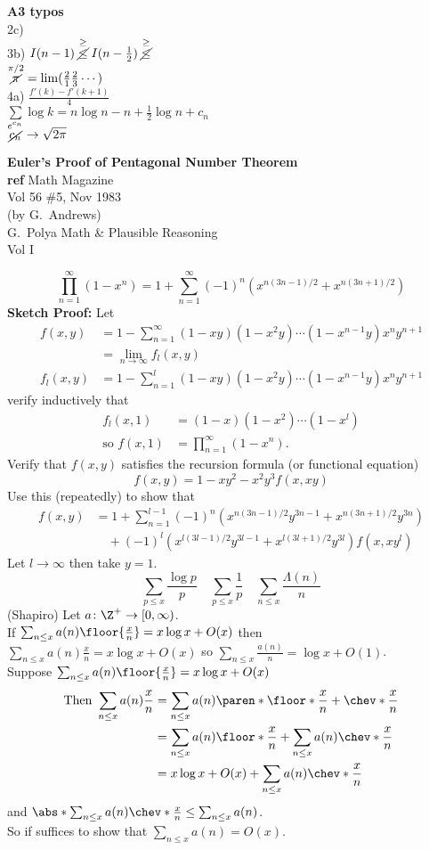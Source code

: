 \textbf{A3 typos} \\
2c) \\
3b) $I(n-1)\mathrel{\overset{\geq}{\cancel{\leq}}}I(n-\tfrac12)\mathrel{\overset{\geq}{\cancel{\leq}}}$ \\
$\overset{\pi/2}{\cancel{\pi}}=\lim(\frac21\frac23\dotsm)$ \\
4a) $\frac{f'(k)-f'(k+1)}{4}$ \\
$\sum\log k=n\log n-n+\frac12\log n+c_n$ \\
$\overset{e^{c_n}}{\cancel{c_n}}\to\sqrt{2\pi}$

\textbf{Euler's Proof of Pentagonal Number Theorem} \\
\textbf{ref} Math Magazine \\
Vol 56 \#5, Nov 1983 \\
(by G.~Andrews) \\
G.~Polya Math \& Plausible Reasoning \\
Vol I

\thm
\[ \prod_{n=1}^\infty(1-x^n) = 1 + \sum_{n=1}^\infty (-1)^n(x^{n(3n-1)/2}+x^{n(3n+1)/2}) \]
\textbf{Sketch Proof:} Let
\begin{align*}
f(x,y) &= 1 - \sum_{n=1}^\infty (1-xy)(1-x^2y)\dotsm(1-x^{n-1}y)x^ny^{n+1} \\
&= \lim_{n\to\infty} f_l(x,y) \\
f_l(x,y) &= 1 - \sum_{n=1}^l (1-xy)(1-x^2y)\dotsm(1-x^{n-1}y)x^ny^{n+1}
\end{align*}
verify inductively that
\begin{align*}
f_l(x,1) &= (1-x)(1-x^2)\dotsm(1-x^l) \\
\text{so } f(x,1) &= \prod_{n=1}^\infty (1-x^n) .
\end{align*}
Verify that $f(x,y)$ satisfies the recursion formula (or functional equation)
\[ f(x,y) = 1 - xy^2 - x^2 y^3 f(x,xy) \]
Use this (repeatedly) to show that
\begin{align*}
f(x,y) &= 1 + \sum_{n=1}^{l-1}(-1)^n(x^{n(3n-1)/2}y^{3n-1}+x^{n(3n+1)/2}y^{3n}) \\
&\quad + (-1)^l(x^{l(3l-1)/2}y^{3l-1}+x^{l(3l+1)/2}y^{3l})f(x,xy^l)
\end{align*}
Let $l\to\infty$ then take $y=1$.
\[ \sum_{p\leq x}\frac{\log p}{p} \quad \sum_{p\leq x}\frac1p \quad \sum_{n\leq x}\frac{\Lambda(n)}{n} \]
\lem (Shapiro) Let $a\colon\Z^+\to[0,\infty)$. \\
If $\sum_{n\leq x}a(n)\floor{\frac xn}=x\log x+O(x)$ then $\sum_{n\leq x}a(n)\frac xn=x\log x+O(x)$ so $\sum_{n\leq x}\frac{a(n)}{n}=\log x+O(1)$. \\
\pf Suppose $\sum_{n\leq x}a(n)\floor{\frac xn}=x\log x+O(x)$
\begin{align*}
\text{Then } \sum_{n\leq x} a(n)\frac{x}{n} &= \sum_{n\leq x} a(n)\paren*{\floor*{\frac xn}+\chev*{\frac xn}} \\
&= \sum_{n\leq x} a(n)\floor*{\frac xn} + \sum_{n\leq x}a(n)\chev*{\frac xn} \\
&= x\log x + O(x) + \sum_{n\leq x}a(n)\chev*{\frac xn}
\end{align*}
and $\abs*{\sum_{n\leq x}a(n)\chev*{\frac xn}}\leq\sum_{n\leq x}a(n)$. \\
So if suffices to show that $\sum_{n\leq x}a(n)=O(x)$.

